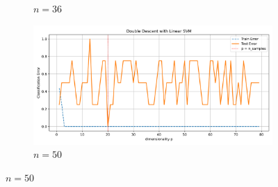 \documentclass[twoside,10pt]{article}
\begin{document}
\begin{figure}[htb]
\begin{subfigure}[b]{\imgwidth}
    \caption{$n=36$}\label{fig:2c1}
  \end{subfigure}%
  \hfill
  \begin{subfigure}[b]{\imgwidth}
    \includegraphics[width=\linewidth]{img_qq/risk_curve_n30.png}
    \caption{$n=50$}\label{fig:2d1}
  \end{subfigure}

  \medskip


\end{figure}
\end{document}
